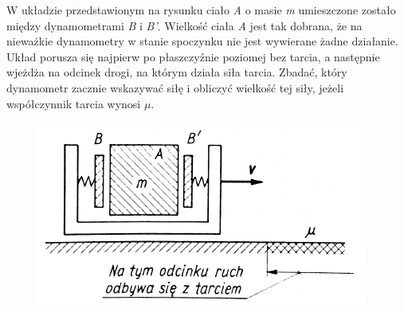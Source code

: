 W układzie przedstawionym na rysunku ciało \emph{A} o masie \emph{m} umieszczone zostało między dynamometrami \emph{B} i \emph{B'}. Wielkość ciała \emph{A} jest tak dobrana, że na nieważkie dynamometry w stanie spoczynku nie jest wywierane żadne działanie. Układ porusza się najpierw po płaszczyźnie poziomej bez tarcia, a następnie wjeżdża na odcinek drogi, na którym działa siła tarcia. Zbadać, który dynamometr zacznie wskazywać siłę i obliczyć wielkość tej siły, jeżeli współczynnik tarcia wynosi $\mu$.
\begin{figure}[h]
	\centering
	\includegraphics[width=0.4\linewidth]{../rysunki/dynamika/dwa-dynamometry}
\end{figure}

